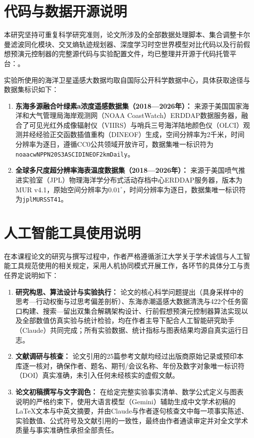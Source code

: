 \section{代码与数据开源说明}

本研究坚持可重复科学研究准则，论文所涉及的全部数据处理脚本、集合调整卡尔曼滤波同化模块、交叉熵轨迹规划器、深度学习时空世界模型对比代码以及行前假想预演元控制器的完整源代码与实验配置文件，均已整理并开源于代码托管平台：。

实验所使用的海洋卫星遥感大数据均取自国际公开科学数据中心，具体获取途径与数据集标识如下：
\begin{enumerate}
  \item \textbf{东海多源融合叶绿素a浓度遥感数据集（2018—2026年）：} 来源于美国国家海洋和大气管理局海岸观测网（NOAA CoastWatch）ERDDAP数据服务器，融合了可见光红外成像辐射仪（VIIRS）与哨兵三号海洋陆地颜色仪（OLCI）观测并经经验正交函数插值重构（DINEOF）生成，空间分辨率为2千米，时间分辨率为逐日，遵循CC0公共领域开放许可，数据集唯一标识符为\texttt{noaacwNPPN20S3ASCIDINEOF2kmDaily}。
  \item \textbf{全球多尺度超分辨率海表温度数据集（2018—2026年）：} 来源于美国喷气推进实验室（JPL）物理海洋学分布式活动存档中心ERDDAP服务器，版本为MUR v4.1，原始空间分辨率为$0.01^\circ$，时间分辨率为逐日，数据集唯一标识符为\texttt{jplMURSST41}。
\end{enumerate}

\section{人工智能工具使用说明}

在本课程论文的研究与撰写过程中，作者严格遵循浙江大学关于学术诚信与人工智能工具规范使用的相关规定，采用人机协同模式开展工作，各环节的具体分工与责任界定说明如下：
\begin{enumerate}
  \item \textbf{研究构思、算法设计与实验执行：} 论文的核心科学问题提出（具身采样中的思考—行动权衡与过思考偏差剖析）、东海赤潮遥感大数据清洗与422个任务窗口构建、搜索—留出双集合解耦架构设计、行前假想预演元控制器算法实现以及全部数值仿真实验与统计检验，均在作者主导下配合人工智能研究助手（Claude）共同完成；所有实验数据、统计指标与图表结果均源自真实运行日志。
  \item \textbf{文献调研与核查：} 论文引用的25篇参考文献均经过出版商原始记录或预印本库逐一核对，确保作者、题名、期刊/会议名称、年份及数字对象唯一标识符（DOI）真实准确，未引入任何未经核实的虚假文献。
  \item \textbf{论文初稿撰写与文字润色：} 在给定完整实验事实清单、数学公式定义与图表说明的严格约束下，使用大语言模型（Gemini）辅助生成中文学术初稿的LaTeX文本与中英文摘要，并由Claude与作者逐句核查文中每一项事实陈述、实验数值、公式符号及文献引用的一致性，最终由作者通读审定并对全文学术质量与事实准确性承担全部责任。
\end{enumerate}
